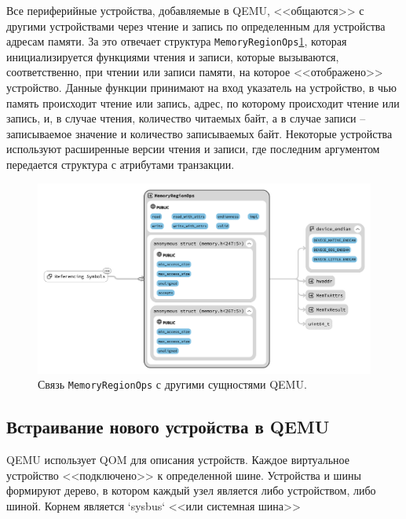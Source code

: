 
Все периферийные устройства, добавляемые в QEMU, <<общаются>> с другими устройствами через чтение и запись
по определенным для устройства адресам памяти.
За это отвечает структура \texttt{MemoryRegionOps}\cref{fig:mem-reg-ops},
которая инициализируется функциями чтения и записи,
которые вызываются, соответственно, при чтении или записи памяти, на которое <<отображено>> устройство.
Данные функции принимают на вход указатель на устройство, в чью память происходит чтение или запись,
адрес, по которому происходит чтение или запись, и, в случае чтения, количество читаемых байт,
а в случае записи -- записываемое значение и количество записываемых байт.
Некоторые устройства используют расширенные версии чтения и записи, где последним аргументом передается
структура с атрибутами транзакции.

\begin{figure}[!htbp]
    \centering
    \begin{adjustbox}{max totalsize={\textwidth}{\textheight}}
        \includegraphics[]{images/mem_reg_ops_cropped.png}
    \end{adjustbox}
    \caption{Связь \texttt{MemoryRegionOps} с другими сущностями QEMU.}\label{fig:mem-reg-ops}
\end{figure}


\subsection{Встраивание нового устройства в QEMU}\label{sec:ch1/sec4/sub2/sub4}

QEMU использует QOM для описания устройств. Каждое виртуальное устройство <<подключено>> к определенной
шине. Устройства и шины формируют дерево, в котором каждый узел является либо устройством, либо
шиной. Корнем является `sysbus` <<или системная шина>>

